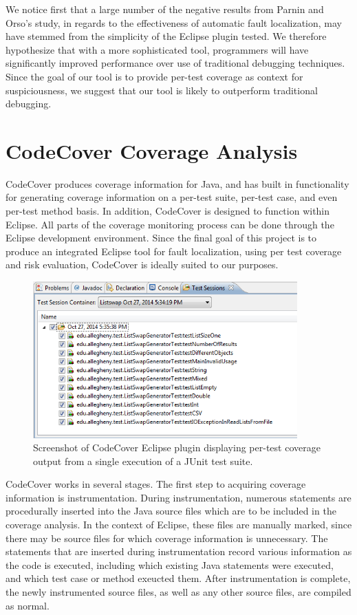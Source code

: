 We notice first that a large number of the negative results from Parnin and Orso's
study, in regards to the effectiveness of automatic fault localization, may have
stemmed from the simplicity of the Eclipse plugin tested.  We therefore hypothesize
that with a more sophisticated tool, programmers will have significantly improved
performance over use of traditional debugging techniques.  Since the goal of our
tool is to provide per-test coverage as context for suspiciousness, we suggest that
our tool is likely to outperform traditional debugging.

\section{CodeCover Coverage Analysis}\label{sec:cover}
CodeCover produces coverage information for Java, and has built in 
functionality for generating coverage information on a per-test suite,
per-test case, and even per-test method basis.  In addition, CodeCover
is designed to function within Eclipse.  All parts of the coverage
monitoring process can be done through the Eclipse development
environment.  Since the final goal of this project is to produce an
integrated Eclipse tool for fault localization, using per test
coverage and risk evaluation, CodeCover is ideally suited to our
purposes.  

\begin{figure}[htpb]
  \centering
  \includegraphics[width=4in]{img/codecoverpertest.png}
  \caption{Screenshot of CodeCover Eclipse plugin displaying per-test coverage
  output from a single execution of a JUnit test suite.}
  \label{codecover}
\end{figure}

CodeCover works in several stages.  The first step to acquiring coverage
information is instrumentation.  During instrumentation, numerous
statements are procedurally inserted into the Java source files which 
are to be included in the coverage analysis.  In the context of Eclipse,
these files are manually marked, since there may be source files for 
which coverage information is unnecessary.  The statements that are 
inserted during instrumentation record various information as the code
is executed, including which existing Java statements were executed, and
which test case or method exeucted them.  After instrumentation is
complete, the newly instrumented source files, as well as any other source
files, are compiled as normal.

